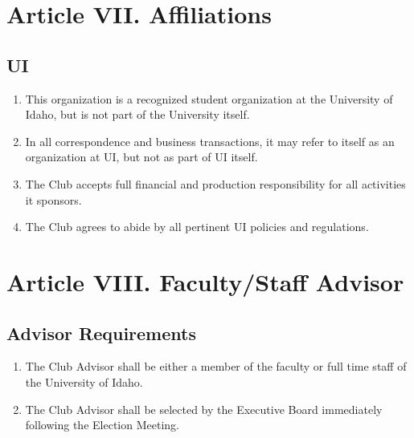 \documentclass[12pt]{scrartcl} %
\begin{document}
\section{Article VII. Affiliations}

		\subsection{UI}
		\begin{enumerate}
			\item This organization is a recognized student organization at the University of Idaho, but is not part of the University itself.
			\item In all correspondence and business transactions, it may refer to itself as an organization at UI, but not as part of UI itself.
			\item The Club accepts full financial and production responsibility for all activities it sponsors.
			\item The Club agrees to abide by all pertinent UI policies and regulations.
		\end{enumerate}

\section{Article VIII. Faculty/Staff Advisor}
	
	\subsection{Advisor Requirements}
		\begin{enumerate}
			\item The Club Advisor shall be either a member of the faculty or full time staff of the University of Idaho.
			\item The Club Advisor shall be selected by the Executive Board immediately following the Election Meeting.
		\end{enumerate}
\end{document}
